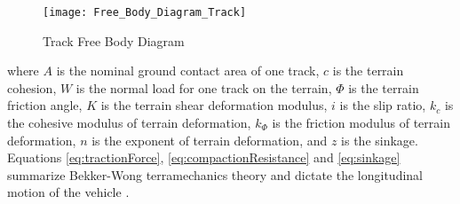 \begin{figure}[tb]
    \centering
    \texttt{[image: Free\_Body\_Diagram\_Track]}
    \caption{Track Free Body Diagram}
    \label{fig:Free_Body_Diagram_Track}
\end{figure}
where $A$ is the nominal ground contact area of one track, $c$ is the terrain cohesion, $W$ is the normal load for one track on the terrain, $\Phi$ is the terrain friction angle, $K$ is the terrain shear deformation modulus, $i$  is the slip ratio, $k_c$ is the cohesive modulus of terrain deformation, $k_\Phi$ is the friction modulus of terrain deformation, $n$ is the exponent of terrain deformation, and $z$ is the sinkage. Equations \ref{eq:tractionForce}, \ref{eq:compactionResistance} and \ref{eq:sinkage} summarize Bekker-Wong terramechanics theory and dictate the longitudinal motion of the vehicle \cite{Wong2008}.


